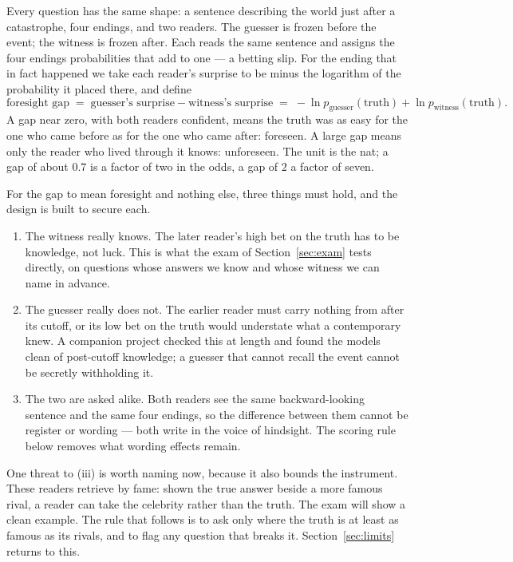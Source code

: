\documentclass[11pt]{article}
\begin{document}
Every question has the same shape: a sentence describing the world just after a catastrophe, four endings,
and two readers. The guesser is frozen before the event; the witness is frozen after. Each reads the same
sentence and assigns the four endings probabilities that add to one --- a betting slip. For the ending that
in fact happened we take each reader's surprise to be minus the logarithm of the probability it placed
there, and define
\[
\text{foresight gap} \;=\; \text{guesser's surprise} - \text{witness's surprise}
\;=\; -\ln p_{\text{guesser}}(\text{truth}) + \ln p_{\text{witness}}(\text{truth}).
\]
A gap near zero, with both readers confident, means the truth was as easy for the one who came before as
for the one who came after: foreseen. A large gap means only the reader who lived through it knows:
unforeseen. The unit is the nat; a gap of about $0.7$ is a factor of two in the odds, a gap of $2$ a factor
of seven.

For the gap to mean foresight and nothing else, three things must hold, and the design is built to secure
each.
\begin{enumerate}[label=(\roman*),leftmargin=2.2em,itemsep=2pt]
\item The witness really knows. The later reader's high bet on the truth has to be knowledge, not luck.
This is what the exam of Section~\ref{sec:exam} tests directly, on questions whose answers we know and
whose witness we can name in advance.
\item The guesser really does not. The earlier reader must carry nothing from after its cutoff, or its low
bet on the truth would understate what a contemporary knew. A companion project checked this at length and
found the models clean of post-cutoff knowledge; a guesser that cannot recall the event cannot be secretly
withholding it.
\item The two are asked alike. Both readers see the same backward-looking sentence and the same four
endings, so the difference between them cannot be register or wording --- both write in the voice of
hindsight. The scoring rule below removes what wording effects remain.
\end{enumerate}

One threat to (iii) is worth naming now, because it also bounds the instrument. These readers retrieve by
fame: shown the true answer beside a more famous rival, a reader can take the celebrity rather than the
truth. The exam will show a clean example. The rule that follows is to ask only where the truth is at least
as famous as its rivals, and to flag any question that breaks it. Section~\ref{sec:limits} returns to this.
\end{document}
